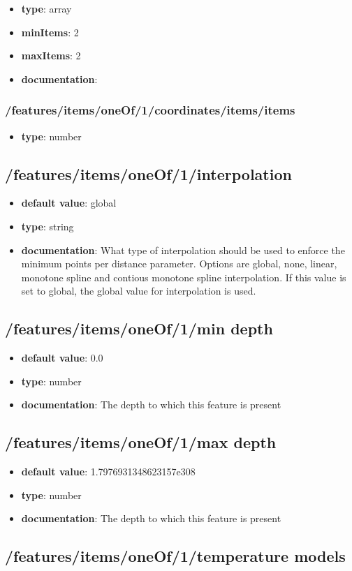 \begin{itemize}\item {\bf type}: array
\item {\bf minItems}: 2
\item {\bf maxItems}: 2
\item {\bf documentation}: 
\end{itemize}\subsubsection{/features/items/oneOf/1/coordinates/items/items}
\begin{itemize}\item {\bf type}: number
\end{itemize}\subsection{/features/items/oneOf/1/interpolation}
\begin{itemize}\item {\bf default value}: global
\item {\bf type}: string
\item {\bf documentation}: What type of interpolation should be used to enforce the minimum points per distance parameter. Options are global, none, linear, monotone spline and contious monotone spline interpolation. If this value is set to global, the global value for interpolation is used.
\end{itemize}\subsection{/features/items/oneOf/1/min depth}
\begin{itemize}\item {\bf default value}: 0.0
\item {\bf type}: number
\item {\bf documentation}: The depth to which this feature is present
\end{itemize}\subsection{/features/items/oneOf/1/max depth}
\begin{itemize}\item {\bf default value}: 1.7976931348623157e308
\item {\bf type}: number
\item {\bf documentation}: The depth to which this feature is present
\end{itemize}\subsection{/features/items/oneOf/1/temperature models}
